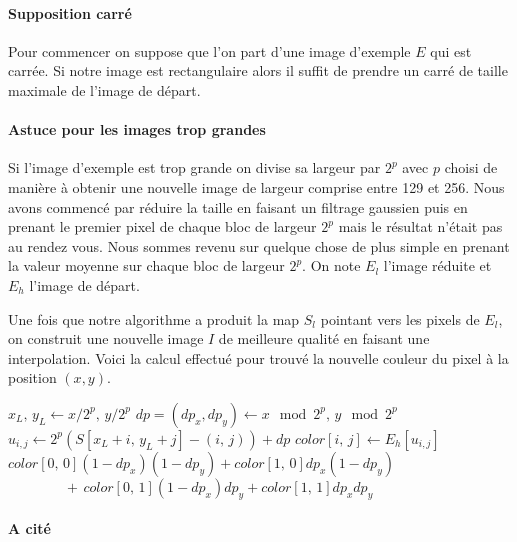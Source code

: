 \documentclass[12pt]{article}
\begin{document}
\paragraph{Supposition carré}
Pour commencer on suppose que l'on part d'une image d'exemple $E$ qui est carrée. Si notre image est rectangulaire alors il suffit de prendre un carré de taille maximale de l'image de départ.

\paragraph{Astuce pour les images trop grandes}
Si l'image d'exemple est trop grande on divise sa largeur par $2^p$ avec $p$ choisi de manière à obtenir une nouvelle image de largeur comprise entre 129 et 256. Nous avons commencé par réduire la taille en faisant un filtrage gaussien puis en prenant le premier pixel de chaque bloc de largeur $2^p$ mais le résultat n'était pas au rendez vous. Nous sommes revenu sur quelque chose de plus simple en prenant la valeur moyenne sur chaque bloc de largeur $2^p$. On note $E_l$ l'image réduite et $E_h$ l'image de départ.

Une fois que notre algorithme a produit la map $S_l$ pointant vers les pixels de $E_l$, on construit une nouvelle image $I$ de meilleure qualité en faisant une interpolation. Voici la calcul effectué pour trouvé la nouvelle couleur du pixel à la position $(x, y)$.

	\begin{algorithmic}[1]
			\State $x_L, \, y_L \gets x / 2^p, \, y / 2^p$
			\State $dp = (dp_x, dp_y) \gets x \mod 2^p, \, y \mod 2^p$
				\State $u_{i, j} \gets 2^p \left( S \left[ x_L + i, \, y_L + j \right] - \left( i, \, j \right) \right) + dp$
				\State $color \left[ i, \, j \right] \gets E_h \left[ u_{i, j} \right]$
			\EndFor
			\State \Return $color \left[ 0, \, 0 \right] (1 - dp_x) (1 - dp_y)
						+ color \left[ 1, \, 0 \right] dp_x (1 - dp_y)$
			\State $\qquad \qquad + \, color \left[ 0, \, 1 \right] (1 - dp_x) dp_y
						+ color \left[ 1, \, 1 \right] dp_x dp_y$
		\EndFunction
	\end{algorithmic}

\paragraph{A cité}
\cite{Ary++}

\appendix



\end{document}
